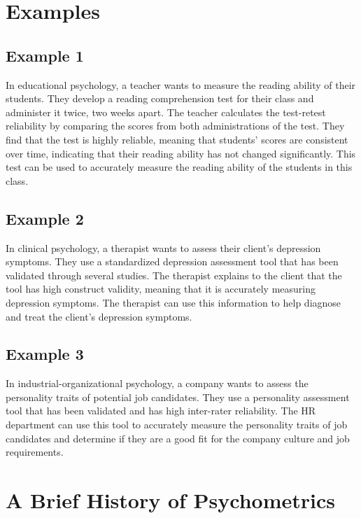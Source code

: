 \documentclass[12pt, a4paper]{exam}
\begin{document}
\section{Examples}

\subsection{Example 1}

In educational psychology, a teacher wants to measure the reading ability of their students. They develop a reading comprehension test for their class and administer it twice, two weeks apart. The teacher calculates the test-retest reliability by comparing the scores from both administrations of the test. They find that the test is highly reliable, meaning that students’ scores are consistent over time, indicating that their reading ability has not changed significantly. This test can be used to accurately measure the reading ability of the students in this class.

\subsection{Example 2}

In clinical psychology, a therapist wants to assess their client’s depression symptoms. They use a standardized depression assessment tool that has been validated through several studies. The therapist explains to the client that the tool has high construct validity, meaning that it is accurately measuring depression symptoms. The therapist can use this information to help diagnose and treat the client’s depression symptoms.

\subsection{Example 3}

In industrial-organizational psychology, a company wants to assess the personality traits of potential job candidates. They use a personality assessment tool that has been validated and has high inter-rater reliability. The HR department can use this tool to accurately measure the personality traits of job candidates and determine if they are a good fit for the company culture and job requirements.

\section{A Brief History of Psychometrics}
\end{document}
